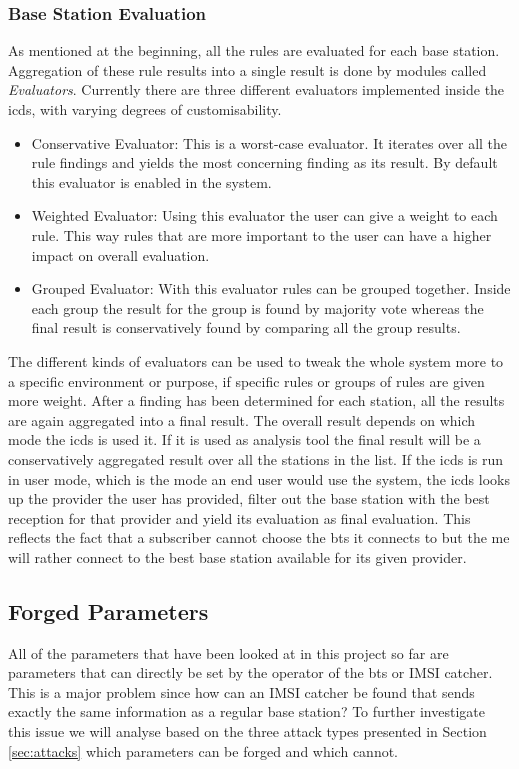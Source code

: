 \subsubsection{Base Station Evaluation}
As mentioned at the beginning, all the rules are evaluated for each base station.
Aggregation of these rule results into a single result is done by modules called \emph{Evaluators}.
Currently there are three different evaluators implemented inside the \gls{icds}, with varying degrees of customisability.
\begin{itemize}
	\item Conservative Evaluator: This is a worst-case evaluator.
	It iterates over all the rule findings and yields the most concerning finding as its result.
	By default this evaluator is enabled in the system.
	\item Weighted Evaluator: Using this evaluator the user can give a weight to each rule.
	This way rules that are more important to the user can have a higher impact on overall evaluation.
	\item Grouped Evaluator: With this evaluator rules can be grouped together.
	Inside each group the result for the group is found by majority vote whereas the final result is conservatively found by comparing all the group results.
\end{itemize}
The different kinds of evaluators can be used to tweak the whole system more to a specific environment or purpose, if specific rules or groups of rules are given more weight.
After a finding has been determined for each station, all the results are again aggregated into a final result.
The overall result depends on which mode the \gls{icds} is used it.
If it is used as analysis tool the final result will be a conservatively aggregated result over all the stations in the list.
If the \gls{icds} is run in user mode, which is the mode an end user would use the system, the \gls{icds} looks up the provider the user has provided, filter out the base station with the best reception for that provider and yield its evaluation as final evaluation.
This reflects the fact that a subscriber cannot choose the \gls{bts} it connects to but the \gls{me} will rather connect to the best base station available for its given provider.

\subsection{Forged Parameters}
\label{sec:fake_parameters}
All of the parameters that have been looked at in this project so far are parameters that can directly be set by the operator of the \gls{bts} or IMSI catcher.
This is a major problem since how can an IMSI catcher be found that sends exactly the same information as a regular base station?
To further investigate this issue we will analyse based on the three attack types presented in Section \ref{sec:attacks} which parameters can be forged and which cannot.

